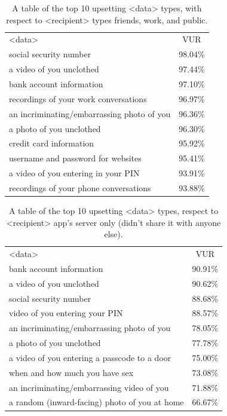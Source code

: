 \documentclass{acm_proc_article-sp}
\begin{document}
\begin{table}[t]
\begin{center}
\begin{tabular}{| l | c |}
<data> & VUR  \\
social security number & 98.04\% \\
a video of you unclothed & 97.44\% \\
bank account information & 97.10\% \\
recordings of your work conversations & 96.97\% \\
an incriminating/embarrassing photo of you & 96.36\% \\
a photo of you unclothed & 96.30\% \\
credit card information & 95.92\% \\
username and password for websites & 95.41\% \\
a video of you entering in your PIN & 93.91\% \\
recordings of your phone conversations & 93.88\% \\
\end{tabular}
\caption{A table of the top 10 upsetting <data> types, with respect to <recipient> types friends, work, and public.}
\label{sharedtop10}
\end{center}
\end{table}

\begin{table}[t]
\begin{center}
\begin{tabular}{| l | c |}
<data> &  VUR  \\
bank account information & 90.91\% \\
a video of you unclothed & 90.62\% \\
social security number  & 88.68\% \\
video of you entering your PIN & 88.57\% \\
an incriminating/embarrassing photo of you & 78.05\% \\
a photo of you unclothed & 77.78\% \\
a video of you entering a passcode to a door & 75.00\% \\
when and how much you have sex & 73.08\% \\
an incriminating/embarrassing video of you & 71.88\% \\
a random (inward-facing) photo of you at home & 66.67\% \\
\end{tabular}
\caption{A table of the top 10 upsetting <data> types, respect to <recipient> app's server only (didn't share it with anyone else).}
\label{notsharedtop10}
\end{center}
\end{table}
\end{document}
